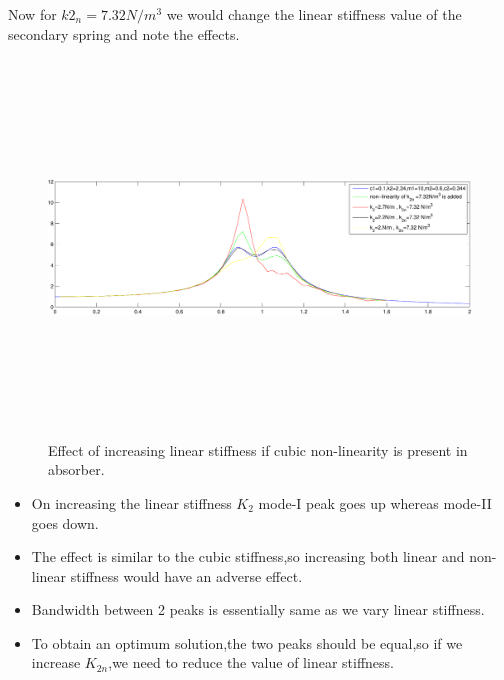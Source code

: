 Now for $k2_n=7.32 N/m^3$ we would change the linear stiffness value of the secondary spring and note the effects.
\begin{figure}[h!]
\includegraphics[width=16cm,height=10cm]{"figures/nonlinearity_secondary_2"}
  \caption{Effect of increasing linear stiffness if cubic non-linearity is present in absorber.}
  \label{fig:non-linear secondary 2}
  \end{figure}
  \begin{itemize}
  \item On increasing the linear stiffness $K_2$ mode-I peak goes up whereas mode-II goes down.
  \item The effect is similar to the cubic stiffness,so increasing both linear and non-linear stiffness would have an adverse effect.
  \item Bandwidth between 2 peaks is essentially same as we vary linear stiffness.
  \item To obtain an optimum solution,the two peaks should be equal,so if we increase $K_{2n}$,we need to reduce the value of linear stiffness.
  \end{itemize}
